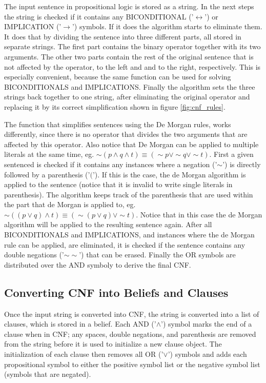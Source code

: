 \documentclass[a4paper,10pt]{article}
\begin{document}
The input sentence in propositional logic is stored as a string. In the next steps the string is checked if it contains any BICONDITIONAL ('$\leftrightarrow$') or IMPLICATION ('$\rightarrow$') symbols. If it does the algorithm starts to eliminate them. It does that by dividing the sentence into three different parts, all stored in separate strings. The first part contains the binary operator together with its two arguments. The other two parts contain the rest of the original sentence that is not affected by the operator, to the left and and to the right, respectively. This is especially convenient, because the same function can be used for solving BICONDITIONALS and IMPLICATIONS. Finally the algorithm sets the three strings back together to one string, after eliminating the original operator and replacing it by its correct simplification shown in figure \ref{fig:cnf_rules}.

The function that simplifies sentences using the De Morgan rules, works differently, since there is no operator that divides the two arguments that are affected by this operator. Also notice that De Morgan can be applied to multiple literals at the same time, eg. $\sim(p\wedge q\wedge t) \equiv (\sim p\vee\sim q\vee\sim t)$. First a given sentenced is checked if it contains any instances where a negation ('$\sim$') is directly followed by a parenthesis ('$($'). If this is the case, the de Morgan algorithm is applied to the sentence (notice that it is invalid to write single literals in parenthesis). The algorithm keeps track of the parenthesis that are used within the part that de Morgan is applied to, eg. $\sim((p\vee q)\wedge t) \equiv (\sim(p\vee q)\vee\sim t)$. Notice that in this case the de Morgan algorithm will be applied to the resulting sentence again. After all BICONDITIONALS and IMPLICATIONS, and instances where the de Morgan rule can be applied, are eliminated, it is checked if the sentence contains any double negations ('$\sim\sim$') that can be erased. Finally the OR symbols are distributed over the AND symboly to derive the final CNF.

\subsection{Converting CNF into Beliefs and Clauses}
\label{subsec:implementation}
Once the input string is converted into CNF, the string is converted into a list of clauses, which is stored in a belief. Each AND ('$\wedge$') symbol marks the end of a clause when in CNF; any spaces, double negations, and parenthesis are removed from the string before it is used to initialize a new clause object. The initialization of each clause then removes all OR ('$\vee$') symbols and adds each propositional symbol to either the positive symbol list or the negative symbol list (symbols that are negated).
\end{document}
